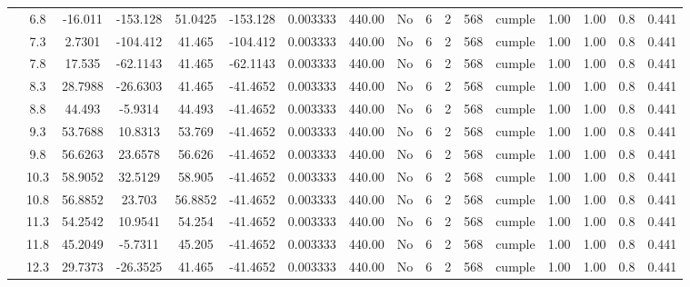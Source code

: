 \begin{table}[H]
{\begin{tabular}{|c|c|c|c|c|c|c|c|c|c|c|c|c|c|c|c|c|}
\cline{2-17}    & \cellcolor[rgb]{ .851,  .882,  .949}6.8 & -16.011 & -153.128 & 51.0425 & -153.128 & 0.003333 & 440.00 & No  & 6   & 2   & 568 & \cellcolor[rgb]{ .776,  .937,  .808}cumple & 1.00 & 1.00 & 0.8 & 0.441 \bigstrut\\
\cline{2-17}    & 7.3 & 2.7301 & -104.412 & 41.465 & -104.412 & 0.003333 & 440.00 & No  & 6   & 2   & 568 & \cellcolor[rgb]{ .776,  .937,  .808}cumple & 1.00 & 1.00 & 0.8 & 0.441 \bigstrut\\
\cline{2-17}    & 7.8 & 17.535 & -62.1143 & 41.465 & -62.1143 & 0.003333 & 440.00 & No  & 6   & 2   & 568 & \cellcolor[rgb]{ .776,  .937,  .808}cumple & 1.00 & 1.00 & 0.8 & 0.441 \bigstrut\\
\cline{2-17}    & 8.3 & 28.7988 & -26.6303 & 41.465 & -41.4652 & 0.003333 & 440.00 & No  & 6   & 2   & 568 & \cellcolor[rgb]{ .776,  .937,  .808}cumple & 1.00 & 1.00 & 0.8 & 0.441 \bigstrut\\
\cline{2-17}    & 8.8 & 44.493 & -5.9314 & 44.493 & -41.4652 & 0.003333 & 440.00 & No  & 6   & 2   & 568 & \cellcolor[rgb]{ .776,  .937,  .808}cumple & 1.00 & 1.00 & 0.8 & 0.441 \bigstrut\\
\cline{2-17}    & 9.3 & 53.7688 & 10.8313 & 53.769 & -41.4652 & 0.003333 & 440.00 & No  & 6   & 2   & 568 & \cellcolor[rgb]{ .776,  .937,  .808}cumple & 1.00 & 1.00 & 0.8 & 0.441 \bigstrut\\
\cline{2-17}    & 9.8 & 56.6263 & 23.6578 & 56.626 & -41.4652 & 0.003333 & 440.00 & No  & 6   & 2   & 568 & \cellcolor[rgb]{ .776,  .937,  .808}cumple & 1.00 & 1.00 & 0.8 & 0.441 \bigstrut\\
\cline{2-17}    & 10.3 & 58.9052 & 32.5129 & 58.905 & -41.4652 & 0.003333 & 440.00 & No  & 6   & 2   & 568 & \cellcolor[rgb]{ .776,  .937,  .808}cumple & 1.00 & 1.00 & 0.8 & 0.441 \bigstrut\\
\cline{2-17}    & 10.8 & 56.8852 & 23.703 & 56.8852 & -41.4652 & 0.003333 & 440.00 & No  & 6   & 2   & 568 & \cellcolor[rgb]{ .776,  .937,  .808}cumple & 1.00 & 1.00 & 0.8 & 0.441 \bigstrut\\
\cline{2-17}    & 11.3 & 54.2542 & 10.9541 & 54.254 & -41.4652 & 0.003333 & 440.00 & No  & 6   & 2   & 568 & \cellcolor[rgb]{ .776,  .937,  .808}cumple & 1.00 & 1.00 & 0.8 & 0.441 \bigstrut\\
\cline{2-17}    & 11.8 & 45.2049 & -5.7311 & 45.205 & -41.4652 & 0.003333 & 440.00 & No  & 6   & 2   & 568 & \cellcolor[rgb]{ .776,  .937,  .808}cumple & 1.00 & 1.00 & 0.8 & 0.441 \bigstrut\\
\cline{2-17}    & 12.3 & 29.7373 & -26.3525 & 41.465 & -41.4652 & 0.003333 & 440.00 & No  & 6   & 2   & 568 & \cellcolor[rgb]{ .776,  .937,  .808}cumple & 1.00 & 1.00 & 0.8 & 0.441 \bigstrut\\

\end{tabular}}
\end{table}
